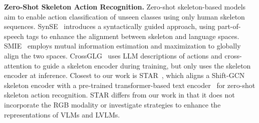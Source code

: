 \textbf{Zero-Shot Skeleton Action Recognition.}
Zero-shot skeleton-based models aim to enable action classification of unseen classes using only human skeleton sequences. SynSE~\cite{synse} introduces a syntactically guided approach, using part-of-speech tags to enhance the alignment between skeleton and language spaces. SMIE~\cite{smie} employs mutual information estimation and maximization to globally align the two spaces. CrossGLG~\cite{crossglg} uses LLM descriptions of actions and cross-attention to guide a skeleton encoder during training, but only uses the skeleton encoder at inference. Closest to our work is STAR~\cite{star}, which aligns a Shift-GCN~\cite{cheng2020shiftgcn} skeleton encoder with a pre-trained transformer-based text encoder~\cite{CLIP} for zero-shot skeleton action recognition. STAR differs from our work in that it does not incorporate the RGB modality or investigate strategies to enhance the representations of VLMs and LVLMs.


